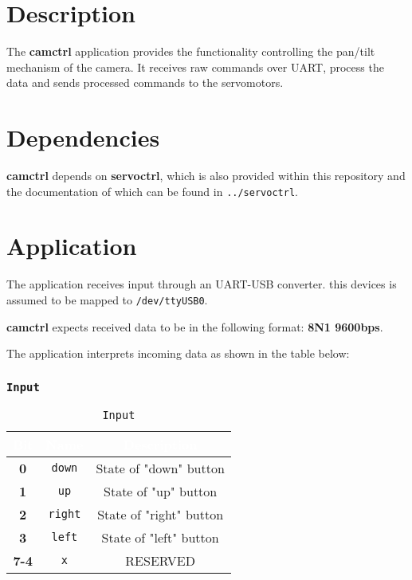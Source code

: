 \section{Description}
The \textbf{camctrl} application provides the functionality controlling the
pan/tilt mechanism of the camera.
It receives raw commands over UART, process the data and sends processed
commands to the servomotors.

\section{Dependencies}
\textbf{camctrl} depends on \textbf{servoctrl}, which is also provided within
this repository and the documentation of which can be found in
\texttt{../servoctrl}.

\section{Application}
The application receives input through an UART-USB converter. this devices is
assumed to be mapped to \texttt{/dev/ttyUSB0}.

\textbf{camctrl} expects received data to be in the following format:
\textbf{8N1 9600bps}.

The application interprets incoming data as shown in the table below:

   \subsubsection{\texttt{Input}}
   \begin{table}[!htb]
      \begin{center}
         \begin{tabular}{|c|c|c|}
            \rowcolor{black}
            \textcolor{white}{\textbf{Bit}}  &
            \textcolor{white}{\textbf{Name}} &
            \textcolor{white}{\textbf{Description}}\\
            \hline
            \hline
            \textbf{0}   & \texttt{down}  & State of "down" button \\
            \hline
            \textbf{1}   & \texttt{up}    & State of "up" button \\
            \hline
            \textbf{2}   & \texttt{right} & State of "right" button \\
            \hline
            \textbf{3}   & \texttt{left}  & State of "left" button \\
            \hline
            \textbf{7-4} & \texttt{x} & RESERVED \\
            \hline
         \end{tabular}
         \caption{\texttt{Input}}
         \label{table:input}
      \end{center}
   \end{table}


